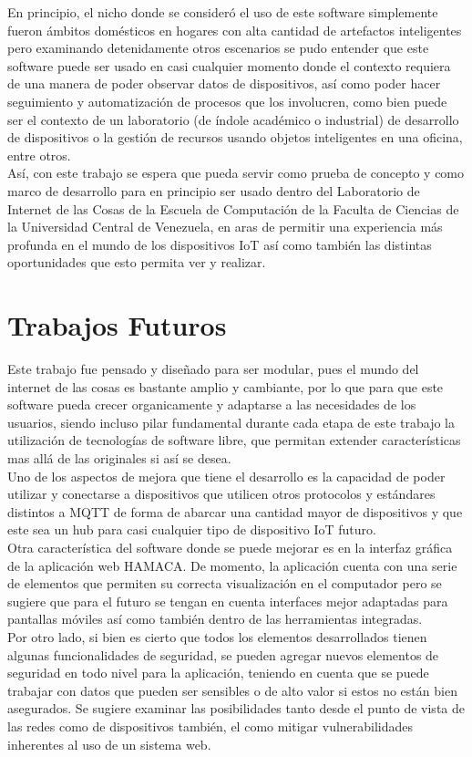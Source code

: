 En principio, el nicho donde se consideró el uso de este software simplemente fueron ámbitos domésticos en hogares con alta cantidad de artefactos inteligentes pero examinando detenidamente otros escenarios se pudo entender que este software puede ser usado en casi cualquier momento donde el contexto requiera de una manera de poder observar datos de dispositivos, así como poder hacer seguimiento y automatización de procesos que los involucren, como bien puede ser el contexto de un laboratorio (de índole académico o industrial) de desarrollo de dispositivos o la gestión de recursos usando objetos inteligentes en una oficina, entre otros.\\
 
Así, con este trabajo se espera que pueda servir como prueba de concepto y como marco de desarrollo para en principio ser usado dentro del Laboratorio de Internet de las Cosas de la Escuela de Computación de la Faculta de Ciencias de la Universidad Central de Venezuela, en aras de permitir una experiencia más profunda en el mundo de los dispositivos IoT así como también las distintas oportunidades que esto permita ver y realizar. 

\section{Trabajos Futuros}
Este trabajo fue pensado y diseñado para ser modular, pues el mundo del internet de las cosas es bastante amplio y cambiante, por lo que para que este software pueda crecer organicamente y adaptarse a las necesidades de los usuarios, siendo incluso pilar fundamental durante cada etapa de este trabajo la utilización de tecnologías de software libre, que permitan extender características mas allá de las originales si así se desea.\\

Uno de los aspectos de mejora que tiene el desarrollo es la capacidad de poder utilizar y conectarse a dispositivos que utilicen otros protocolos y estándares distintos a MQTT de forma de abarcar una cantidad mayor de dispositivos y que este sea un hub para casi cualquier tipo de dispositivo IoT futuro.\\

Otra característica del software donde se puede mejorar es en la interfaz gráfica de la aplicación web HAMACA. De momento, la aplicación cuenta con una serie de elementos que permiten su correcta visualización en el computador pero se sugiere que para el futuro se tengan en cuenta interfaces mejor adaptadas para pantallas móviles así como también dentro de las herramientas integradas.\\

Por otro lado, si bien es cierto que todos los elementos desarrollados tienen algunas funcionalidades de seguridad, se pueden agregar nuevos elementos de seguridad en todo nivel para la aplicación, teniendo en cuenta que se puede trabajar con datos que pueden ser sensibles o de alto valor si estos no están bien asegurados. Se sugiere examinar las posibilidades tanto desde el punto de vista de las redes como de dispositivos también, el como mitigar vulnerabilidades inherentes al uso de un sistema web. 